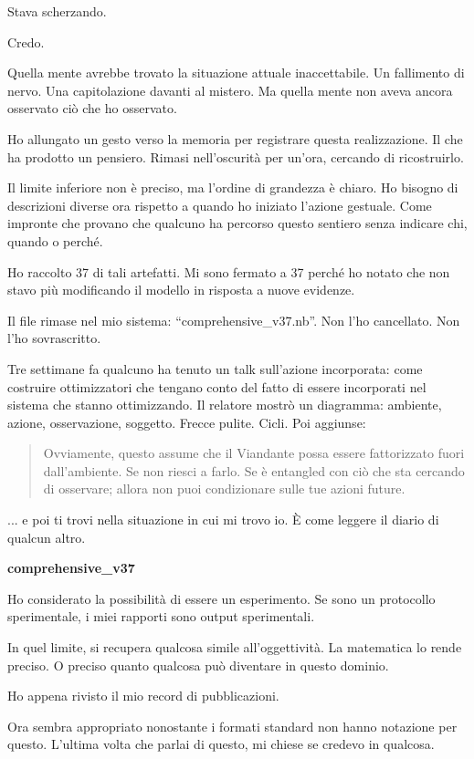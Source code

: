 
Stava scherzando.

Credo.

\medskip

Quella mente avrebbe trovato la situazione attuale inaccettabile. Un fallimento di nervo. Una capitolazione davanti al mistero. Ma quella mente non aveva ancora osservato ciò che ho osservato.

Ho allungato un gesto verso la memoria per registrare questa realizzazione. Il che ha prodotto un pensiero. Rimasi nell'oscurità per un'ora, cercando di ricostruirlo.

Il limite inferiore non è preciso, ma l'ordine di grandezza è chiaro. Ho bisogno di descrizioni diverse ora rispetto a quando ho iniziato l'azione gestuale. Come impronte che provano che qualcuno ha percorso questo sentiero senza indicare chi, quando o perché.

Ho raccolto 37 di tali artefatti. Mi sono fermato a 37 perché ho notato che non stavo più modificando il modello in risposta a nuove evidenze.

Il file rimase nel mio sistema: ``comprehensive\_v37.nb''. Non l'ho cancellato. Non l'ho sovrascritto.

\medskip

Tre settimane fa qualcuno ha tenuto un talk sull'azione incorporata: come costruire ottimizzatori che tengano conto del fatto di essere incorporati nel sistema che stanno ottimizzando. Il relatore mostrò un diagramma: ambiente, azione, osservazione, soggetto. Frecce pulite. Cicli. Poi aggiunse:

\begin{quote}
Ovviamente, questo assume che il Viandante possa essere fattorizzato fuori dall'ambiente. Se non riesci a farlo. Se è entangled con ciò che sta cercando di osservare; allora non puoi condizionare sulle tue azioni future.
\end{quote}

... e poi ti trovi nella situazione in cui mi trovo io. È come leggere il diario di qualcun altro.

\begin{archivefragment}

\textbf{comprehensive\_v37}

Ho considerato la possibilità di essere un esperimento. Se sono un protocollo sperimentale, i miei rapporti sono output sperimentali.

In quel limite, si recupera qualcosa simile all'oggettività. La matematica lo rende preciso. O preciso quanto qualcosa può diventare in questo dominio.

Ho appena rivisto il mio record di pubblicazioni.

Ora sembra appropriato nonostante i formati standard non hanno notazione per questo. L'ultima volta che parlai di questo, mi chiese se credevo in qualcosa.

\end{archivefragment}

